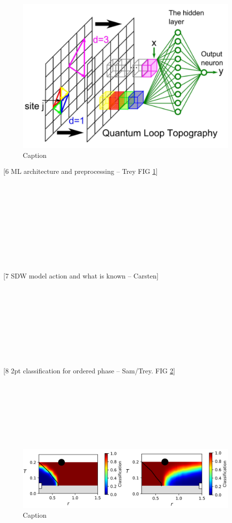 \documentclass[amsmath,amssymb, aps, prx, longbibliography, twocolumn]{revtex4-1}
\begin{document}
 \begin{figure} [t]
    \centering
\includegraphics[width=.5\textwidth]{qlt.png}
    \caption{Caption}
    \label{fig:qlt}
\end{figure}
[6 ML architecture and preprocessing -- Trey FIG \ref{fig:qlt}]
\\
\\
\\
\\
\\
\\
\\
\\
\\
\\
\\


[7 SDW model action and what is known -- Carsten]
\\
\\
\\
\\
\\
\\
\\
\\
\\
\\

[8 2pt classification for ordered phase -- Sam/Trey. FIG \ref{fig:2ptsdw}]
\\
\\
\\
\\
\\
\\
\\
\\
 \begin{figure} [t]
    \centering
\includegraphics[width=.45\textwidth]{2PT-SDW.png}
    \caption{Caption}
    \label{fig:2ptsdw}
\end{figure}
\end{document}
